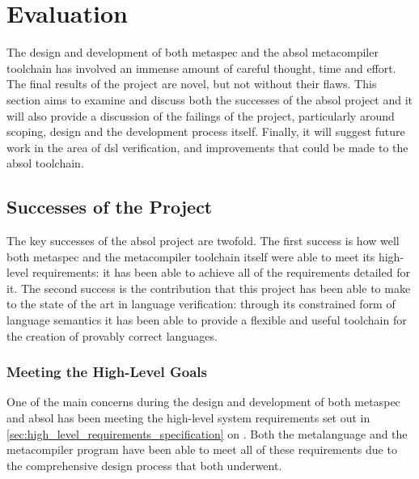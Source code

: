 \chapter{Evaluation} %
\label{cha:evaluation}
The design and development of both \gls{metaspec} and the \gls{absol} metacompiler toolchain has involved an immense amount of careful thought, time and effort.
The final results of the project are novel, but not without their flaws.
This section aims to examine and discuss both the successes of the \gls{absol} project and it will also provide a discussion of the failings of the project, particularly around scoping, design and the development process itself.
Finally, it will suggest future work in the area of \gls{dsl} verification, and improvements that could be made to the \gls{absol} toolchain.

\section{Successes of the Project} %
\label{sec:successes_of_the_project}
The key successes of the \gls{absol} project are twofold. 
The first success is how well both \gls{metaspec} and the metacompiler toolchain itself were able to meet its high-level requirements: it has been able to achieve all of the requirements detailed for it.
The second success is the contribution that this project has been able to make to the state of the art in language verification: through its constrained form of language semantics it has been able to provide a flexible and useful toolchain for the creation of provably correct languages. 

\subsection{Meeting the High-Level Goals} %
\label{sub:meeting_the_high_level_goals}
One of the main concerns during the design and development of both \gls{metaspec} and \gls{absol} has been meeting the high-level system requirements set out in \autoref{sec:high_level_requirements_specification} on . 
Both the metalanguage and the metacompiler program have been able to meet all of these requirements due to the comprehensive design process that both underwent. \\

